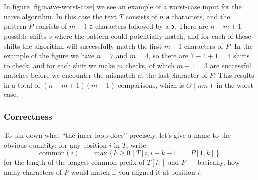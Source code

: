 In figure \ref{fig:naive-worst-case} we see an example of a worst-case input for the naive algorithm.
In this case the text $T$ consists of $n$ \texttt{a} characters, and the pattern $P$ consists of $m-1$ \texttt{a} characters followed by a \texttt{b}.
There are $n-m+1$ possible shifts $s$ where the pattern could potentially match, and for each of these shifts the algorithm will successfully match the first $m-1$ characters of $P$. In the example of the figure we have $n=7$ and $m=4$, so there are $7-4+1=4$ shifts to check, and for each shift we make $m$ checks, of which $m-1=3$ are successful matches before we encounter the mismatch at the last character of $P$.
This results in a total of $(n-m+1)(m-1)$ comparisons, which is $\Theta(nm)$ in the worst case.

\begin{algorithm}[H]
  \caption{Naive exact pattern matching}
\end{algorithm}

\subsubsection{Correctness}

To pin down what ``the inner loop does'' precisely, let's give a name to the obvious quantity: for any position $i$ in $T$, write
\[
  \mathrm{common}(i) \;=\; \max\bigl\{\, k \geq 0 \mid T[i, i+k-1] = P[1,k] \,\bigr\}
\]
for the length of the longest common prefix of $T[i{,}]$ and $P$ — basically, how many characters of $P$ would match if you aligned it at position $i$.

